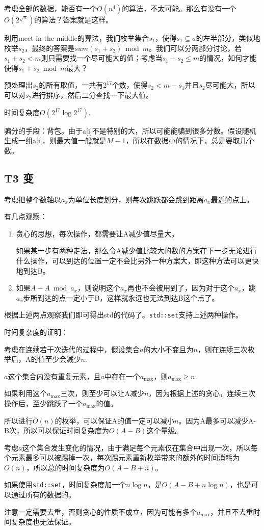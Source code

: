 \documentclass{article}
\begin{document}
考虑全部的数据，能否有一个$O(n^4)$的算法，不太可能。那么有没有一个$O(2^{\sqrt n})$的算法？答案就是这样。

利用meet-in-the-middle的算法，我们枚举集合$s_1$，使得$s_1\subseteq a的左半部分$，类似地枚举$s_2$，最终的答案是$sum(s_1+s_2)\bmod m$。我们可以分两部分讨论，若$s_1+s_2<m$则只需要找一个尽可能大的值；考虑当$s_1+s_2\le m$的情况，如何才能使得$s_1+s_2\bmod m$最大？

预处理出$s_2$的所有取值，一共有$2^{17}$个数，使得$s_2<m-s_1$并且$s_2$尽可能大，所以可以对$s_2$进行排序，然后二分查找一下最大值。

时间复杂度$O(2^{17}\log 2^{17})$.

骗分的手段：背包。由于a[i]不是特别的大，所以可能能骗到很多分数。假设随机生成一组a[i]，则最大值一般就是$M-1$，所以在数据小的情况下，总是要取几个数。
\subsection{T3 变}
考虑把整个数轴以$a_x$为单位长度划分，则每次跳跃都会跳到距离$a_x$最近的点上。

有几点观察：
\begin{enumerate}
    \item{贪心的思想，每次操作，都需要让A减少值尽量大。

    如果某一步有两种走法，那么令A减少值比较大的数的方案在下一步无论进行什么操作，可以到达的位置一定不会比另外一种方案大，即这种方法可以更快地到达B。}
    \item{如果$A-A\bmod a_x$，则说明这个$a_x$再也不会被用到了，因为对于这个$a_x$，跳$a_x$步所到达的点一定小于B，这样就永远也无法到达B这个点了。}
\end{enumerate}
根据上述两点观察我们即可得出std的代码了。\verb+std::set+支持上述两种操作。

时间复杂度的证明：

考虑在连续若干次迭代的过程中，假设集合$a$的大小不变且为$n$，则在连续三次枚举后，A的值至少会减少$n$.

$a$这个集合内没有重复元素，且$a$中存在一个$a_{\max}$，则$a_{\max}\ge n$.

如果利用这个$a_{\max}$三次，则至少可以让A减少$n$，因为根据上述的贪心，连续三次操作后，至少跳跃了一个$a_{\max}$的值。

所以进行$O(n)$的枚举，可以保证A的值一定可以减小$n$。因为A最多可以减少A-B次，所以可以保证时间复杂度为$O(A-B)$这个量级。

考虑$a$这个集合发生变化的情况，由于满足每个元素仅在集合中出现一次，所以每个元素最多可以被踢掉一次，每次踢元素重新枚举带来的额外的时间消耗为$O(n)$，所以总的时间复杂度为$O(A-B+n)$。

如果使用\verb+std::set+，时间复杂度加一个$n\log n$，是$O(A-B+n\log n)$，也是可以通过所有的数据的。

注意一定需要去重，否则贪心的性质不成立，因为可能有多个$a_{\max}$，并且不去重时间复杂度也无法保证。
\end{document}
